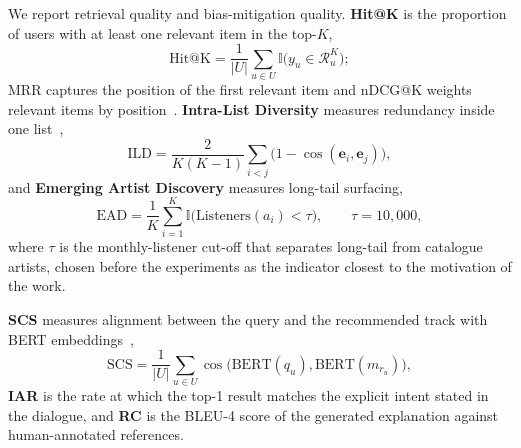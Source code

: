 \documentclass[]{ceurart}
\newcommand{\vect}[1]{\boldsymbol{#1}}
\newcommand{\cosine}{\operatorname{cos}}
\begin{document}
We report retrieval quality and bias-mitigation quality. \textbf{Hit@K} is the
proportion of users with at least one relevant item in the top-$K$,
\begin{equation}
\text{Hit@K} = \frac{1}{|U|} \sum_{u \in U}
  \mathbb{I}\bigl(y_u \in \mathcal{R}_u^K\bigr);
\label{eq:hit}
\end{equation}
MRR captures the position of the first relevant item and nDCG@K weights relevant
items by position~\cite{jarvelin2002cumulated}. \textbf{Intra-List Diversity}
measures redundancy inside one list~\cite{ziegler2005improving},
\begin{equation}
\text{ILD} = \frac{2}{K(K-1)}\sum_{i<j} \bigl(1 -
  \cosine(\vect{e}_i, \vect{e}_j)\bigr),
\label{eq:ild}
\end{equation}
and \textbf{Emerging Artist Discovery} measures long-tail surfacing,
\begin{equation}
\text{EAD} = \frac{1}{K} \sum_{i=1}^{K}
  \mathbb{I}\bigl(\text{Listeners}(a_i) < \tau\bigr),
\qquad \tau = 10{,}000,
\label{eq:ead}
\end{equation}
where $\tau$ is the monthly-listener cut-off that separates long-tail from
catalogue artists, chosen before the experiments as the indicator closest to the
motivation of the work.

\textbf{SCS} measures alignment between the query and the recommended track with
BERT embeddings~\cite{devlin2019bert,gao2021advances},
\begin{equation}
\text{SCS} = \frac{1}{|U|}\sum_{u \in U}
  \cosine\bigl(\text{BERT}(q_u), \text{BERT}(m_{r_u})\bigr),
\label{eq:scs}
\end{equation}
\textbf{IAR} is the rate at which the top-1 result matches the explicit intent
stated in the dialogue, and \textbf{RC} is the BLEU-4 score of the generated
explanation against human-annotated references.
\end{document}
